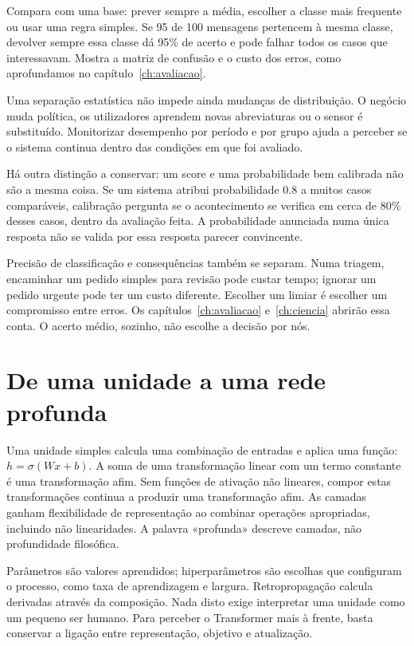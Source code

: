Compara com uma base: prever sempre a média, escolher a classe mais frequente ou usar uma regra simples. Se 95 de 100 mensagens pertencem à mesma classe, devolver sempre essa classe dá 95\% de acerto e pode falhar todos os casos que interessavam. Mostra a matriz de confusão e o custo dos erros, como aprofundamos no capítulo~\ref{ch:avaliacao}.

Uma separação estatística não impede ainda mudanças de distribuição. O negócio muda política, os utilizadores aprendem novas abreviaturas ou o sensor é substituído. Monitorizar desempenho por período e por grupo ajuda a perceber se o sistema continua dentro das condições em que foi avaliado.

Há outra distinção a conservar: um score e uma probabilidade bem calibrada não são a mesma coisa. Se um sistema atribui probabilidade $0.8$ a muitos casos comparáveis, calibração pergunta se o acontecimento se verifica em cerca de 80\% desses casos, dentro da avaliação feita. A probabilidade anunciada numa única resposta não se valida por essa resposta parecer convincente.

Precisão de classificação e consequências também se separam. Numa triagem, encaminhar um pedido simples para revisão pode custar tempo; ignorar um pedido urgente pode ter um custo diferente. Escolher um limiar é escolher um compromisso entre erros. Os capítulos~\ref{ch:avaliacao} e~\ref{ch:ciencia} abrirão essa conta. O acerto médio, sozinho, não escolhe a decisão por nós.

\section{De uma unidade a uma rede profunda}
Uma unidade simples calcula uma combinação de entradas e aplica uma função: $h=\sigma(Wx+b)$. A soma de uma transformação linear com um termo constante é uma transformação afim. Sem funções de ativação não lineares, compor estas transformações continua a produzir uma transformação afim. As camadas ganham flexibilidade de representação ao combinar operações apropriadas, incluindo não linearidades. A palavra «profunda» descreve camadas, não profundidade filosófica.

Parâmetros são valores aprendidos; hiperparâmetros são escolhas que configuram o processo, como taxa de aprendizagem e largura. Retropropagação calcula derivadas através da composição. Nada disto exige interpretar uma unidade como um pequeno ser humano. Para perceber o Transformer mais à frente, basta conservar a ligação entre representação, objetivo e atualização.

